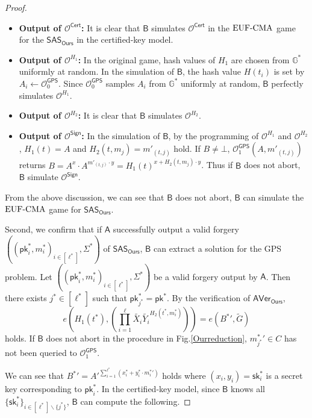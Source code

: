 \documentclass[a4paper,11pt]{fullverllncs}
\newcommand{\A}{\mathsf{A}}
\newcommand{\B}{\mathsf{B}}
\newcommand{\G}{\mathbb{G}}
\newcommand{\Ours}{\mathsf{Ours}}
\newcommand{\sk}{\mathsf{sk}}
\newcommand{\pk}{\mathsf{pk}}
\newcommand{\Sign}{\mathsf{Sign}}
\newcommand{\AVer}{\mathsf{AVer}}
\newcommand{\rmEUFCMA}{\mathrm{EUF}\mathchar`-\mathrm{CMA}}
\newcommand{\Cert}{\mathsf{Cert}}
\newcommand{\GPS}{\mathsf{GPS}}
\newcommand{\SAS}{\mathsf{SAS}}
\begin{document}
\begin{proof}
\begin{itemize}
\item {\bf Output of $\mathcal{O^{\Cert}}$:} 
It is clear that $\B$ simulates $\mathcal{O^{\Cert}}$ in the $\rmEUFCMA$ game for the $\SAS_{\Ours}$ in the certified-key model.

\item {\bf Output of $\mathcal{O}^{H_1}$:} 
In the original game, hash values of $H_1$ are chosen from $\G^*$ uniformly at random.
In the simulation of $\B$, the hash value $H(t_i)$ is set by $A_i \leftarrow \mathcal{O}^{\GPS}_{0}$.
Since $ \mathcal{O}^{\GPS}_{0}$ samples $A_i$ from $\G^*$ uniformly at random, $\B$ perfectly simulates $\mathcal{O}^{H_1}$.

\item {\bf Output of $\mathcal{O}^{H_2}$:} 
It is clear that $\B$ simulates $\mathcal{O}^{H_2}$.


\item {\bf Output of $\mathcal{O^{\Sign}}$:}
In the simulation of $\B$, by the programming of $\mathcal{O}^{H_1}$ and $\mathcal{O}^{H_2}$,  $H_1(t)=A$ and $H_2(t, m_j) = m'_{(t,j)}$ hold.
If $B \neq \bot$,  $\mathcal{O}^{\GPS}_{1} (A, m'_{(t,j)})$ returns $B = A^{x} \cdot A^{m'_{(t,j)} \cdot y} = H_1(t)^{x + H_2(t, m_j)  \cdot y}$.
Thus if $\B$ does not abort, $\B$ simulate $\mathcal{O^{\Sign}}$.
\end{itemize}
From the above discussion, we can see that $\B$ does not abort, $\B$ can simulate the $\rmEUFCMA$ game for $\SAS_{\Ours}$.



Second, we confirm that if $\A$ successfully output a valid forgery $((\pk^*_i, m^*_i)_{i \in [\ell^*]}, \allowbreak \Sigma^*)$ of $\SAS_{\Ours}$, $\B$ can extract a solution for the GPS problem.
Let $((\pk^*_i, m^*_i)_{i \in [\ell^*]}, \allowbreak \Sigma^*)$ be a valid forgery output by $\A$.
Then there exists $j^* \in [\ell^*]$ such that $\pk^*_{j^*} = \pk^*$.
By the verification of $\AVer_{\Ours}$, 
\begin{equation*}
e(H_1(t^*), (\prod^{\ell}_{i=1}\widetilde{X_i}\widetilde{Y_i}^{H_2(t^*, m_i^*)})) = e(B^*{}', \widetilde{G}) 
\end{equation*}
holds.
If $\B$ does not abort in the procedure  in Fig.\ref{Ourreduction}, $m^*_{j^*}{}' \in C$ has not been queried to $\mathcal{O}^{\GPS}_{1}$.

We can see that $B^*{}' = A'{}^{\sum^{\ell^*}_{i=1} (x^*_i + y^*_i \cdot m_i^*{}')}$ holds where $(x_i, y_i) = \sk^*_i$ is a secret key corresponding to $\pk^*_i$.
In the certified-key model, since $\B$ knows all $\{\sk^*_i\}_{i \in [\ell^*]\backslash \{j^*\}}$, $\B$ can compute the following.


\end{proof}
\end{document}
